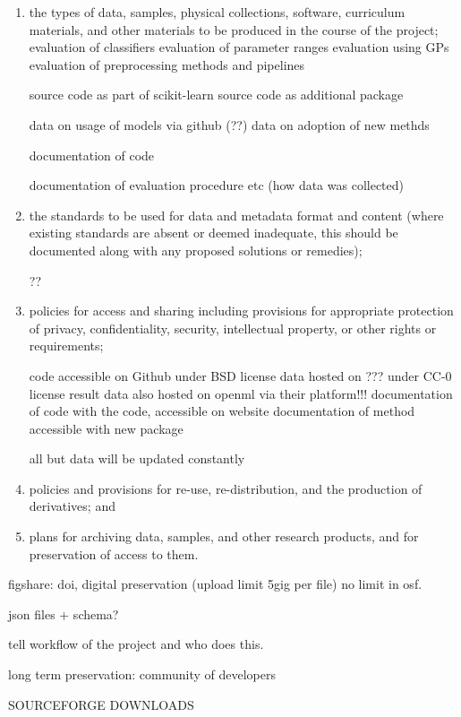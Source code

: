 \begin{enumerate}
\item the types of data, samples, physical collections, software, curriculum
    materials, and other materials to be produced in the course of the project;
evaluation of classifiers
evaluation of parameter ranges
evaluation using GPs
evaluation of preprocessing methods and pipelines

source code as part of scikit-learn
source code as additional package

data on usage of models via github (??)
data on adoption of new methds


documentation of code

documentation of evaluation procedure etc (how data was collected)

\item the standards to be used for data and metadata format and content (where
    existing standards are absent or deemed inadequate, this should be
    documented along with any proposed solutions or remedies);

??

\item policies for access and sharing including provisions for appropriate
    protection of privacy, confidentiality, security, intellectual property, or
    other rights or requirements;

code accessible on Github under BSD license
data hosted on ??? under CC-0 license
result data also hosted on openml via their platform!!!
documentation of code with the code, accessible on website
documentation of method accessible with new package


all but data will be updated constantly

\item policies and provisions for re-use, re-distribution, and the production
    of derivatives; and

\item plans for archiving data, samples, and other research products, and for
    preservation of access to them.

\end{enumerate}

%




figshare: doi, digital preservation (upload limit 5gig per file)
no limit in osf.

json files + schema?

tell workflow of the project
and who does this.

long term preservation: community of developers

SOURCEFORGE DOWNLOADS
